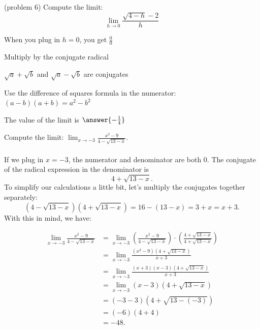 \documentclass[handout]{ximera}
\begin{document}
\begin{problem} (problem 6)
Compute the limit:
  \[
  \lim_{h \to 0} \frac{\sqrt{4-h}-2}{h}
  \]
  
    \begin{hint}
      When you plug in $h = 0$, you get $\frac00$
    \end{hint}
    \begin{hint}
      Multiply by the conjugate radical
    \end{hint}
    \begin{hint}
      $\sqrt a + \sqrt b$ and $\sqrt a - \sqrt b$ are conjugates
    \end{hint}
    \begin{hint}
      Use the difference of squares formula in the numerator: $(a-b)(a+b) = a^2 - b^2$ 
    \end{hint}
    
		The value of the limit is
		 $\answer{-\frac14}$
		
\end{problem}







\begin{example}[example 7]
Compute the limit: $\displaystyle{\lim_{x \to -3} \frac{x^2 - 9}{4 - \sqrt{13 -x}}}$.\\
\\
If we plug in $x = -3$, the numerator and denominator are both 0. The conjugate of the radical expression in the denominator is
\[ 4 + \sqrt{13 -x}.\]
To simplify our calculations a little bit, let's multiply the conjugates together separately:
\[(4 - \sqrt{13 -x})(4 + \sqrt{13 -x}) = 16 - (13-x) = 3+x = x+3.\]
With this in mind, we have:

\begin{align*}
\lim_{x \to -3} \frac{x^2 - 9}{4 - \sqrt{13 -x}} &= 
\lim_{x \to -3} \left(\frac{x^2 - 9}{4 - \sqrt{13 -x}}\right) \cdot \left(\frac{4 + \sqrt{13 -x}}{4 + \sqrt{13 -x}}\right) \\[.4 em]
&=\lim_{x \to -3} \frac{(x^2 - 9)\left(4 + \sqrt{13 -x}\right)}{x+3}\\[.4 em]
&=\lim_{x \to -3} \frac{(x+3)(x-3)\left(4 + \sqrt{13 -x}\right)}{x+3} \\[.4 em]
&= \lim_{x \to -3} (x-3)\left(4 + \sqrt{13 -x}\right)\\[.4 em]
&= (-3-3)\left(4 + \sqrt{13- (-3)}\right) \\[.4 em]
&= (-6)(4 + 4) \\[.4 em]
&= -48.
\end{align*}
\end{example}
\end{document}
